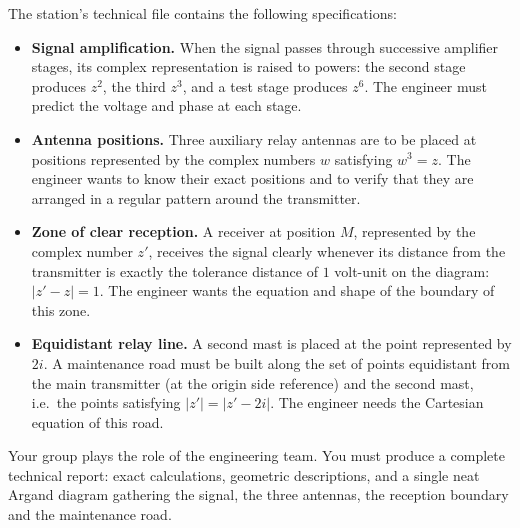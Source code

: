 \documentclass[11pt]{article}
\newcounter{popsec}
\newcounter{popsub}
\newcommand{\courssub}[1]{%
  \stepcounter{popsub}%
  \par\vspace{9pt}\noindent{\popxbold\fontsize{11.5}{13}\selectfont\color{popink}{\color{poporange}\thepopsec.\thepopsub}\hspace{6pt}#1}\par\nopagebreak\vspace{4pt}
}
\begin{document}
The station's technical file contains the following specifications:

\begin{itemize}
\item \textbf{Signal amplification.} When the signal passes through successive amplifier stages, its complex representation is raised to powers: the second stage produces $z^{2}$, the third $z^{3}$, and a test stage produces $z^{6}$. The engineer must predict the voltage and phase at each stage.
\item \textbf{Antenna positions.} Three auxiliary relay antennas are to be placed at positions represented by the complex numbers $w$ satisfying $w^{3} = z$. The engineer wants to know their exact positions and to verify that they are arranged in a regular pattern around the transmitter.
\item \textbf{Zone of clear reception.} A receiver at position $M$, represented by the complex number $z'$, receives the signal clearly whenever its distance from the transmitter is exactly the tolerance distance of $1$ volt-unit on the diagram: $|z' - z| = 1$. The engineer wants the equation and shape of the boundary of this zone.
\item \textbf{Equidistant relay line.} A second mast is placed at the point represented by $2i$. A maintenance road must be built along the set of points equidistant from the main transmitter (at the origin side reference) and the second mast, i.e.\ the points satisfying $|z'| = |z' - 2i|$. The engineer needs the Cartesian equation of this road.
\end{itemize}

Your group plays the role of the engineering team. You must produce a complete technical report: exact calculations, geometric descriptions, and a single neat Argand diagram gathering the signal, the three antennas, the reception boundary and the maintenance road.

\courssub{Tasks}
\end{document}
